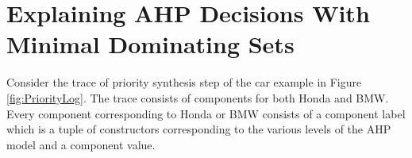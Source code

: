 \documentclass{jfp}
\begin{document}



\section{Explaining AHP Decisions With Minimal Dominating Sets}
Consider the trace of priority synthesis step of the car example in Figure \ref{fig:PriorityLog}. The trace consists of components for both Honda and BMW. Every component corresponding to Honda or BMW consists of a component label which is a tuple of constructors corresponding to the various levels of the AHP model and a component value. 
\end{document}
